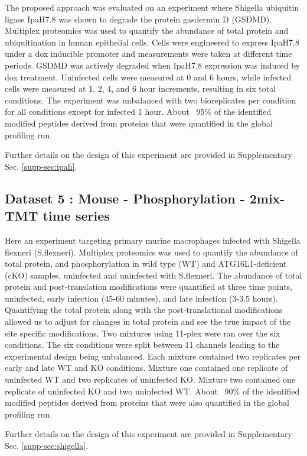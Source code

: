 \documentclass[mcp]{article}
\numberwithin{table}{section}
\begin{document}
The proposed approach was evaluated on an experiment where Shigella ubiquitin ligase IpaH7.8 was shown to degrade the protein gasdermin D (GSDMD)\cite{LUCHETTI2021}. Multiplex proteomics was used to quantify the abundance of total protein and ubiquitination in human epithelial cells. Cells were engineered to express IpaH7.8 under a dox inducible promoter and measurements were taken at different time periods. GSDMD was actively degraded when IpaH7.8 expression was induced by dox treatment. Uninfected cells were measured at 0 and 6 hours, while infected cells were measured at 1, 2, 4, and 6 hour increments, resulting in six total conditions. The experiment was unbalanced with two bioreplicates per condition for all conditions except for infected 1 hour. About ~95\% of the identified modified peptides derived from proteins that were quantified in the global profiling run.

Further details on the design of this experiment are provided in Supplementary Sec. \ref{supp-sec:ipah}. 

\subsection*{Dataset 5 : Mouse - Phosphorylation - 2mix-TMT time series}

Here an experiment targeting primary murine macrophages infected with Shigella flexneri (S.flexneri)\cite{Maculins}. Multiplex proteomics was used to quantify the abundance of total protein, and phosphorylation in wild type (WT) and ATG16L1-deficient (cKO) samples, uninfected and uninfected with S.flexneri. The abundance of total protein and post-translation modifications were quantified at three time points, uninfected, early infection (45-60 minutes), and late infection (3-3.5 hours). Quantifying the total protein along with the post-translational modifications allowed us to adjust for changes in total protein and see the true impact of the site specific modifications. Two mixtures using 11-plex were ran over the six conditions. The six conditions were split between 11 channels leading to the experimental design being unbalanced. Each mixture contained two replicates per early and late WT and KO conditions. Mixture one contained one replicate of uninfected WT and two replicates of uninfected KO. Mixture two contained one replicate of uninfected KO and two uninfected WT. About ~90\% of the identified modified peptides derived from proteins that were also quantified in the global profiling run.

Further details on the design of this experiment are provided in Supplementary Sec. \ref{supp-sec:shigella}.
\end{document}
